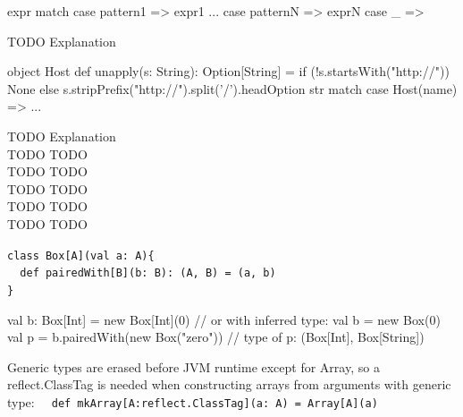 \documentclass[article, a5paper]{memoir}
\newcommand{\LangColor}{red}
\newcommand{\head}[1]{{\bfseries {\color{\LangColor}{#1}}\par\vspace{1mm}\hrule\vspace{-2mm}}}
\newcommand{\code}{\lstinline[basicstyle=\ttfamily]}
\newcommand{\Newline}{\vspace{\baselineskip}}
\begin{document}
\clearpage\vspace*{-2.0em}\head{Pattern matching and type tests}\vspace{0.5em}

\begin{minipage}{0.3\linewidth}%
\begin{Code}
expr match {
  case pattern1 => expr1
  ...
  case patternN => exprN
  case _ =>
}
\end{Code}
\end{minipage}%
\hfill\begin{minipage}{0.6\linewidth}
\raggedright{\small
TODO Explanation
}%
\end{minipage}



\begin{minipage}{0.6\linewidth}%
{\small
\begin{Code}
object Host {
  def unapply(s: String): Option[String] = 
    if (!s.startsWith("http://")) None
    else s.stripPrefix("http://").split('/').headOption
}
str match { case Host(name) => ... }
\end{Code}
}%
\end{minipage}%
\begin{minipage}{0.4\linewidth}
{\hfill\raggedleft\small
TODO Explanation \\
TODO TODO \\
TODO TODO \\
TODO TODO \\
TODO TODO \\
TODO TODO \\
}%
\end{minipage}




\vspace{0.5em}\head{Generic classes and methods}\Newline
{\small
\code|class Box[A](val a: A){ | \\
\code|  def pairedWith[B](b: B): (A, B) = (a, b)| \\
\code|}|

\begin{Code}
val b: Box[Int] = new Box[Int](0) // or with inferred type: val b = new Box(0)
val p = b.pairedWith(new Box("zero")) // type of p: (Box[Int], Box[String])  
\end{Code}

Generic types are erased before JVM runtime except for Array, so a reflect.ClassTag is needed when constructing arrays from arguments with generic type: \code|  def mkArray[A:reflect.ClassTag](a: A) = Array[A](a)| 
}%
\end{document}
